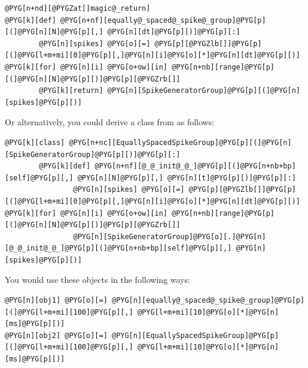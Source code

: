 \documentclass[letterpaper,10pt,english]{manual}
\begin{document}
\begin{Verbatim}[commandchars=@\[\]]
@PYG[n+nd][@PYGZat[]magic@_return]
@PYG[k][def] @PYG[n+nf][equally@_spaced@_spike@_group]@PYG[p][(]@PYG[n][N]@PYG[p][,] @PYG[n][dt]@PYG[p][)]@PYG[p][:]
        @PYG[n][spikes] @PYG[o][=] @PYG[p][@PYGZlb[]]@PYG[p][(]@PYG[l+m+mi][0]@PYG[p][,]@PYG[n][i]@PYG[o][*]@PYG[n][dt]@PYG[p][)] @PYG[k][for] @PYG[n][i] @PYG[o+ow][in] @PYG[n+nb][range]@PYG[p][(]@PYG[n][N]@PYG[p][)]@PYG[p][@PYGZrb[]]
        @PYG[k][return] @PYG[n][SpikeGeneratorGroup]@PYG[p][(]@PYG[n][spikes]@PYG[p][)]
\end{Verbatim}

Or alternatively, you could derive a class from \hyperlink{brian.SpikeGeneratorGroup}{}
as follows:

\begin{Verbatim}[commandchars=@\[\]]
@PYG[k][class] @PYG[n+nc][EquallySpacedSpikeGroup]@PYG[p][(]@PYG[n][SpikeGeneratorGroup]@PYG[p][)]@PYG[p][:]
        @PYG[k][def] @PYG[n+nf][@_@_init@_@_]@PYG[p][(]@PYG[n+nb+bp][self]@PYG[p][,] @PYG[n][N]@PYG[p][,] @PYG[n][t]@PYG[p][)]@PYG[p][:]
                @PYG[n][spikes] @PYG[o][=] @PYG[p][@PYGZlb[]]@PYG[p][(]@PYG[l+m+mi][0]@PYG[p][,]@PYG[n][i]@PYG[o][*]@PYG[n][dt]@PYG[p][)] @PYG[k][for] @PYG[n][i] @PYG[o+ow][in] @PYG[n+nb][range]@PYG[p][(]@PYG[n][N]@PYG[p][)]@PYG[p][@PYGZrb[]]
                @PYG[n][SpikeGeneratorGroup]@PYG[o][.]@PYG[n][@_@_init@_@_]@PYG[p][(]@PYG[n+nb+bp][self]@PYG[p][,] @PYG[n][spikes]@PYG[p][)]
\end{Verbatim}

You would use these objects in the following ways:

\begin{Verbatim}[commandchars=@\[\]]
@PYG[n][obj1] @PYG[o][=] @PYG[n][equally@_spaced@_spike@_group]@PYG[p][(]@PYG[l+m+mi][100]@PYG[p][,] @PYG[l+m+mi][10]@PYG[o][*]@PYG[n][ms]@PYG[p][)]
@PYG[n][obj2] @PYG[o][=] @PYG[n][EquallySpacedSpikeGroup]@PYG[p][(]@PYG[l+m+mi][100]@PYG[p][,] @PYG[l+m+mi][10]@PYG[o][*]@PYG[n][ms]@PYG[p][)]
\end{Verbatim}
\end{document}
